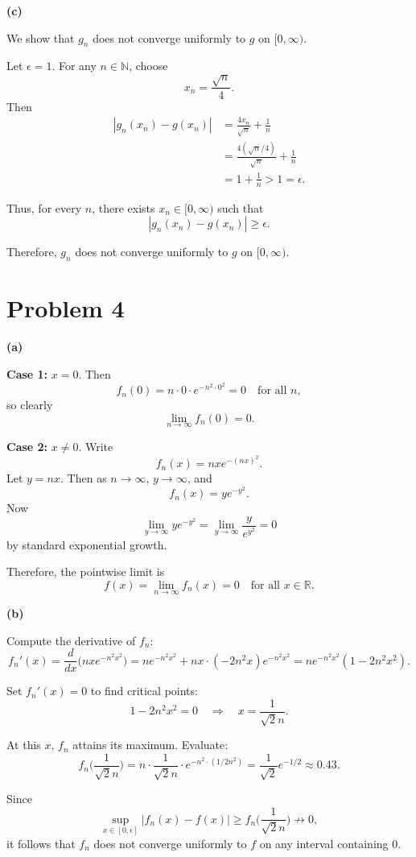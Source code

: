 \documentclass[12pt]{article}
\begin{document}
\textbf{(c)} 

We show that $g_n$ does not converge uniformly to $g$ on $[0,\infty)$.

Let $\epsilon = 1$. For any $n \in \mathbb{N}$, choose
\[
x_n = \frac{\sqrt{n}}{4}.
\]
Then
\begin{align*}
|g_n(x_n) - g(x_n)|
&= \frac{4x_n}{\sqrt{n}} + \frac{1}{n} \\
&= \frac{4(\sqrt{n}/4)}{\sqrt{n}} + \frac{1}{n} \\
&= 1 + \frac{1}{n} > 1 = \epsilon.
\end{align*}

Thus, for every $n$, there exists $x_n \in [0,\infty)$ such that
\[
|g_n(x_n) - g(x_n)| \ge \epsilon.
\]

Therefore, $g_n$ does not converge uniformly to $g$ on $[0,\infty)$.

\section*{Problem 4}
\textbf{(a)}

\textbf{Case 1:} $x = 0$. Then
\[
f_n(0) = n \cdot 0 \cdot e^{-n^2 \cdot 0^2} = 0 \quad \text{for all } n,
\]
so clearly
\[
\lim_{n \to \infty} f_n(0) = 0.
\]

\textbf{Case 2:} $x \neq 0$. Write
\[
f_n(x) = n x e^{-(n x)^2}.
\]
Let $y = n x$. Then as $n \to \infty$, $y \to \infty$, and
\[
f_n(x) = y e^{-y^2}.
\]
Now
\[
\lim_{y \to \infty} y e^{-y^2} = \lim_{y \to \infty} \frac{y}{e^{y^2}} = 0
\]
by standard exponential growth.  

Therefore, the pointwise limit is
\[
f(x) = \lim_{n \to \infty} f_n(x) = 0 \quad \text{for all } x \in \mathbb{R}.
\]

\bigskip

\textbf{(b)}

Compute the derivative of $f_n$:
\[
f_n'(x) = \frac{d}{dx} \big( n x e^{-n^2 x^2} \big)
= n e^{-n^2 x^2} + n x \cdot (-2 n^2 x) e^{-n^2 x^2} 
= n e^{-n^2 x^2} (1 - 2 n^2 x^2).
\]

Set $f_n'(x) = 0$ to find critical points:
\[
1 - 2 n^2 x^2 = 0 \quad \Longrightarrow \quad x = \frac{1}{\sqrt{2} n}.
\]

At this $x$, $f_n$ attains its maximum. Evaluate:
\[
f_n\Big(\frac{1}{\sqrt{2} n}\Big) = n \cdot \frac{1}{\sqrt{2} n} \cdot e^{-n^2 \cdot (1/2 n^2)} 
= \frac{1}{\sqrt{2}} e^{-1/2} \approx 0.43.
\]

Since
\[
\sup_{x \in [0, \epsilon]} |f_n(x) - f(x)| \ge f_n\Big(\frac{1}{\sqrt{2} n}\Big) \not\to 0,
\]
it follows that $f_n$ does not converge uniformly to $f$ on any interval containing $0$.
\end{document}
